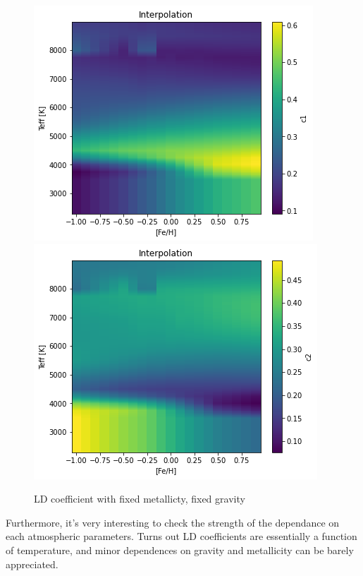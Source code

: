 \documentclass[a4paper,11pt,twocolumn]{article}
\begin{document}
\begin{figure}[H]
    \includegraphics[scale=0.5, angle=0]{../pictures/Claret2017/2017_c1_fixedg}
    \includegraphics[scale=0.5, angle=0]{../pictures/Claret2017/2017_c2_fixedg}
    \caption{LD coefficient with fixed metallicty, fixed gravity}
\end{figure}
Furthermore, it's very interesting to check the strength of the dependance 
on each atmospheric parameters. Turns out LD coefficients are essentially a 
function of temperature, and minor dependences on gravity and metallicity 
can be barely appreciated.
\end{document}
